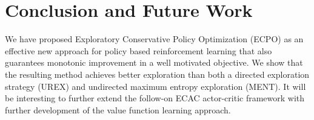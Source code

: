 
\section{Conclusion and Future Work}
\label{sec:conclusion_and_future_work}

We have proposed Exploratory Conservative Policy Optimization (ECPO)
as an effective new approach for policy based reinforcement learning
that also guarantees monotonic improvement in a well motivated objective.
We show that the resulting method achieves better exploration than both
a directed exploration strategy (UREX) and undirected maximum entropy
exploration (MENT). 
It will be interesting to further extend the follow-on
ECAC actor-critic framework
with further development of the value function learning approach.

